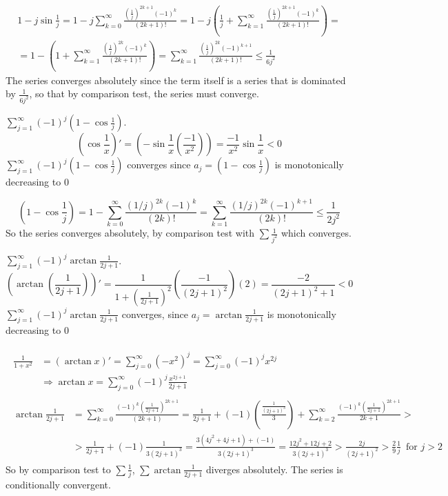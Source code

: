 \documentclass[twoside]{amsart}
\theoremstyle{plain}
\theoremstyle{definition}
\newcommand{\exercisehead}[1]
  {\smallskip
   \noindent{\small\bf Exercise #1.}}
\begin{document}
\[
\begin{gathered}
  1 - j \sin{\frac{1}{j} } = 1 - j \sum_{k=0}^{\infty} \frac{ \left( \frac{1}{j} \right)^{2k+1} (-1)^k }{ (2k+1)! } = 1 - j \left( \frac{1}{j} + \sum_{k=1}^{\infty} \frac{ \left( \frac{1}{j} \right)^{2k+1} (-1)^k }{ (2k+1)! } \right) = \\
  = 1 - \left(1+ \sum_{k=1}^{\infty} \frac{ \left( \frac{1}{j} \right)^{2k} (-1)^k }{ (2k+1)! } \right) = \sum_{k=1}^{\infty} \frac{ \left(\frac{1}{j} \right)^{2k} (-1)^{k+1} }{ (2k+1)! } \leq \frac{1}{6j^2 } 
\end{gathered}
\]
The series converges absolutely since the term itself is a series that is dominated by $\frac{1}{6j^2}$, so that by comparison test, the series must converge.  

\exercisehead{18} $\sum_{j=1}^{\infty} (-1)^j \left( 1 - \cos{ \frac{1}{j} } \right)$.  
\[
  (\cos{ \frac{1}{x} })' = \left( -\sin{\frac{1}{x} } \left( \frac{-1}{x^2} \right) \right) = \frac{-1}{x^2} \sin{ \frac{1}{x} } < 0 
\]
$\sum_{j=1}^{\infty} (-1)^j (1- \cos{\frac{1}{j}} ) $ converges since $a_j = (1- \cos{\frac{1}{j} }) $ is monotonically decreasing to $0$

\[
(1- \cos{\frac{1}{j} }) = 1 - \sum_{k=0}^{\infty} \frac{ (1/j)^{2k} (-1)^k }{ (2k)! } = \sum_{k=1}^{\infty} \frac{ (1/j)^{2k} (-1)^{k+1} }{ (2k)! } \leq \frac{1}{2j^2 } 
\]
So the series converges absolutely, by comparison test with $\sum \frac{1}{j^2 }$ which converges.  

\exercisehead{19} $\sum_{j=1}^{\infty} (-1)^j \arctan{ \frac{1}{2j+1} }$.  
\[
(\arctan{ \left( \frac{1}{2j+1} \right) })' = \frac{1}{ 1 + \left( \frac{1}{2j+1} \right)^2 } \left( \frac{-1}{ (2j+1)^2 } \right) (2) = \frac{ -2 }{ (2j+1)^2 + 1 } < 0  
\]
$\sum_{j=1}^{\infty} (-1)^j \arctan{ \frac{1}{2j+1} }$ converges, since $a_j = \arctan{ \frac{1}{2j+1} }$ is monotonically decreasing to $0$

\[
\begin{gathered}
  \begin{aligned}
    \frac{1}{ 1+x^2} & = (\arctan{x})' = \sum_{j=0}^{\infty} (-x^2)^j = \sum_{j=0}^{\infty} (-1)^j x^{2j} \\
    & \Longrightarrow \arctan{x} = \sum_{j=0}^{\infty} (-1)^j \frac{ x^{2j+1}}{ 2j+1} 
  \end{aligned} \\
\begin{aligned}
  \arctan{ \frac{1}{ 2j+1} } &= \sum_{k=0}^{\infty} \frac{ (-1)^k \left( \frac{1}{2j+1} \right)^{2k+1} }{ (2k+1) } =  \frac{1}{ 2j+1} + (-1)\left( \frac{ \frac{1}{(2j+1)^3} }{ 3  } \right) + \sum_{k=2}^{\infty} \frac{ (-1)^k \left( \frac{1}{ 2j+1} \right)^{2k+1} }{ 2k+1 } > \\
  & > \frac{1}{2j + 1 } + (-1)\frac{1}{ 3 (2j+1)^3 } = \frac{ 3 (4j^2 + 4j + 1 ) + (-1) }{ 3 (2j+1)^3 } = \frac{ 12 j^2 + 12 j + 2 }{ 3(2j+1)^3 } > \frac{ 2j }{ (2j+1)^2 } > \frac{2}{9} \frac{1}{ j} \, \text{ for $j>2$ }
\end{aligned}
\end{gathered}
\]
So by comparison test to $\sum \frac{1}{j}$, $\sum \arctan{\frac{1}{2j+1} }$ diverges absolutely.  The series is conditionally convergent.  
\end{document}
